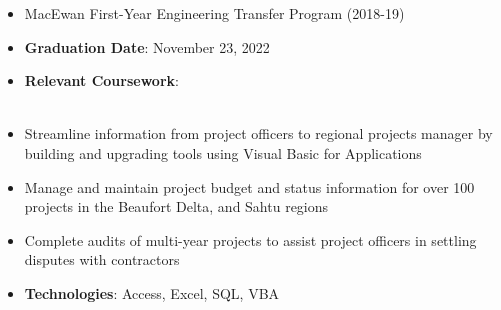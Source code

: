 \documentclass[10pt, letterpaper, ragged2e, withhyper]{altacv}
\begin{document}
\tagline{}

\makecvheader


\begin{paracol}{2}
        \begin{itemize}
            \item MacEwan First-Year Engineering Transfer Program (2018-19)
            \item \textbf{Graduation Date}: November 23, 2022
            \item \textbf{Relevant Coursework}: \vspace*{1.25pt} \\
                
             \\
        \end{itemize}


            \begin{itemize}
                 \item Streamline information from project officers to regional projects manager by building and upgrading tools 
                 using Visual Basic for Applications
                \item Manage and maintain project budget and status information for over 100 projects in the Beaufort Delta, and Sahtu regions  
                \item Complete audits of multi-year projects to assist project officers in settling disputes with contractors 
                \item \textbf{Technologies}: Access, Excel, SQL, VBA 
            \end{itemize}


\end{paracol}
\end{document}
